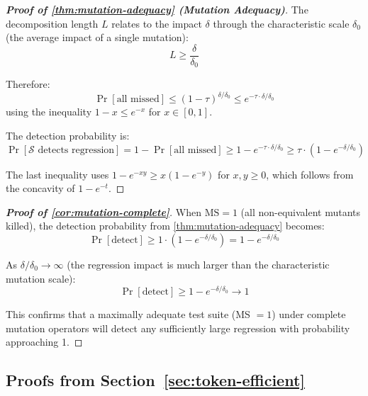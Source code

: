 \begin{proof}[\textbf{Proof of \cref{thm:mutation-adequacy} (Mutation Adequacy)}]
The decomposition length $L$ relates to the impact $\delta$ through the
characteristic scale $\delta_0$ (the average impact of a single
mutation):
\begin{equation}
  L \geq \frac{\delta}{\delta_0}
\end{equation}

Therefore:
\begin{equation}
  \Pr[\text{all missed}] \leq (1-\tau)^{\delta/\delta_0}
  \leq e^{-\tau \cdot \delta/\delta_0}
\end{equation}
using the inequality $1-x \leq e^{-x}$ for $x \in [0,1]$.

The detection probability is:
\begin{equation}
  \Pr[\mathcal{S} \text{ detects regression}]
  = 1 - \Pr[\text{all missed}]
  \geq 1 - e^{-\tau \cdot \delta/\delta_0}
  \geq \tau \cdot (1 - e^{-\delta/\delta_0})
\end{equation}

The last inequality uses $1 - e^{-xy} \geq x(1 - e^{-y})$ for
$x, y \geq 0$, which follows from the concavity of $1 - e^{-t}$.
\qedhere
\end{proof}

\begin{proof}[\textbf{Proof of \cref{cor:mutation-complete}}]

When $\text{MS} = 1$ (all non-equivalent mutants killed), the detection
probability from \cref{thm:mutation-adequacy} becomes:
\begin{equation}
  \Pr[\text{detect}] \geq 1 \cdot (1 - e^{-\delta/\delta_0})
  = 1 - e^{-\delta/\delta_0}
\end{equation}

As $\delta/\delta_0 \to \infty$ (the regression impact is much larger
than the characteristic mutation scale):
\begin{equation}
  \Pr[\text{detect}] \geq 1 - e^{-\delta/\delta_0} \to 1
\end{equation}

This confirms that a maximally adequate test suite (MS $= 1$) under
complete mutation operators will detect any sufficiently large
regression with probability approaching 1. \qedhere
\end{proof}


\subsection{Proofs from Section~\ref{sec:token-efficient}}
\label{app:proofs:token-efficient}

